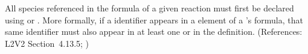 All species referenced in the \KineticLaw formula of a given reaction must
first be declared using \SpeciesReference or \ModifierSpeciesReference.
More formally, if a \Species identifier appears in a  element of
a \Reaction's \KineticLaw formula, that same identifier must also appear in
at least one \SpeciesReference or \ModifierSpeciesReference in the
\Reaction definition.  (References: L2V2 Section~4.13.5; )
